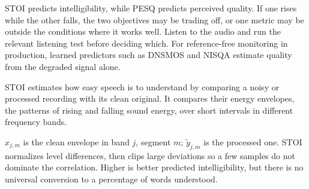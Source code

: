 STOI predicts intelligibility, while PESQ predicts perceived quality. If one rises while the other falls, the two objectives may be
trading off, or one metric may be outside the conditions where it works well. Listen to the audio and run the relevant listening test
before deciding which. For reference-free monitoring in production, learned predictors such as DNSMOS and NISQA estimate quality from
the degraded signal alone.

\metricend
\clearpage
\thispagestyle{genaistyle}
\label{sec:stoi}


STOI estimates how easy speech is to understand by comparing a noisy or processed recording with its clean original. It compares their
energy envelopes, the patterns of rising and falling sound energy, over short intervals in different frequency bands.

\begin{metricformula}
\end{metricformula}

$x_{j,m}$ is the clean envelope in band $j$, segment $m$; $\tilde{y}_{j,m}$ is the processed one. STOI normalizes level differences,
then clips large deviations so a few samples do not dominate the correlation. Higher is better predicted intelligibility, but there is
no universal conversion to a percentage of words understood.

